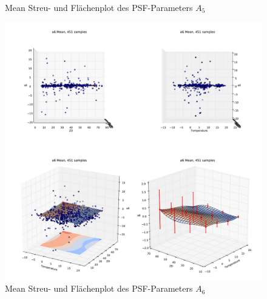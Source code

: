 \begin{appendix}
\begin{figure}[H]
	\caption[Mean Streu- und Flächenplot des PSF-Parameters $A_5$]{Mean Streu- und Flächenplot des PSF-Parameters $A_5$}
    \label{psf_surf_a5_mean}
\end{figure}
\begin{figure}[H]
	\centering
	\includegraphics[scale=.48]{psf_surf/a6_mean.pdf}
	\caption[Mean Streu- und Flächenplot des PSF-Parameters $A_6$]{Mean Streu- und Flächenplot des PSF-Parameters $A_6$}
    \label{psf_surf_a6_mean}
\end{figure}


\end{appendix}
